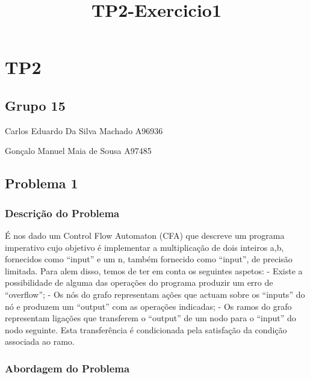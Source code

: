 \documentclass[11pt]{article}
\title{TP2-Exercicio1}
\begin{document}
    
    \maketitle
    
    

    
    \hypertarget{tp2}{%
\section{TP2}\label{tp2}}

\hypertarget{grupo-15}{%
\subsection{Grupo 15}\label{grupo-15}}

Carlos Eduardo Da Silva Machado A96936

Gonçalo Manuel Maia de Sousa A97485

    \hypertarget{problema-1}{%
\subsection{Problema 1}\label{problema-1}}

    \hypertarget{descriuxe7uxe3o-do-problema}{%
\subsubsection{Descrição do
Problema}\label{descriuxe7uxe3o-do-problema}}

    É nos dado um Control Flow Automaton (CFA) que descreve um programa
imperativo cujo objetivo é implementar a multiplicação de dois inteiros
a,b, fornecidos como ``input'' e um n, também fornecido como ``input'',
de precisão limitada. Para alem disso, temos de ter em conta os
seguintes aspetos: - Existe a possibilidade de alguma das operações do
programa produzir um erro de ``overflow''; - Os nós do grafo representam
ações que actuam sobre os ``inputs'' do nó e produzem um ``output'' com
as operações indicadas; - Os ramos do grafo representam ligações que
transferem o ``output'' de um nodo para o ``input'' do nodo seguinte.
Esta transferência é condicionada pela satisfação da condição associada
ao ramo.

    \hypertarget{abordagem-do-problema}{%
\subsubsection{Abordagem do Problema}\label{abordagem-do-problema}}
\end{document}
